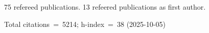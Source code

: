 75 refereed publications. 13 refeered publications as first author.

Total citations~=~5214; h-index~=~38 (2025-10-05)